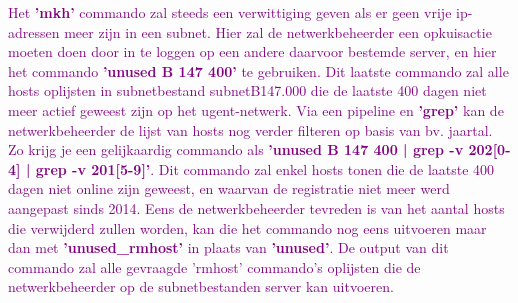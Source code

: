 \textcolor{purple}{Het \textbf{'mkh'} commando zal steeds een verwittiging geven als er geen vrije \acrshort{ip}-adressen meer zijn in een subnet. Hier zal de netwerkbeheerder een opkuisactie moeten doen door in te loggen op een andere daarvoor bestemde server, en hier het commando \textbf{'unused B 147 400'} te gebruiken. Dit laatste commando zal alle hosts oplijsten in subnetbestand subnetB147.000 die de laatste 400 dagen niet meer actief geweest zijn op het \acrshort{ugent}-netwerk. Via een pipeline en \textbf{'grep'} kan de netwerkbeheerder de lijst van hosts nog verder filteren op basis van bv. jaartal. Zo krijg je een gelijkaardig commando als \textbf{'unused B 147 400 | grep -v 202[0-4] | grep -v 201[5-9]'}. 
Dit commando zal enkel hosts tonen die de laatste 400 dagen niet online zijn geweest, en waarvan de registratie niet meer werd aangepast sinds 2014. Eens de netwerkbeheerder tevreden is van het aantal hosts die verwijderd zullen worden, kan die het commando nog eens uitvoeren maar dan met \textbf{'unused\_rmhost'} in plaats van \textbf{'unused'}. De output van dit commando zal alle gevraagde 'rmhost' commando's oplijsten die de netwerkbeheerder op de subnetbestanden server kan uitvoeren.}

